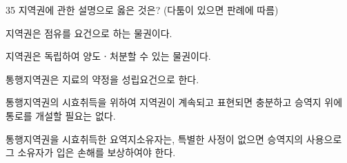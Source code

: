 \begin{question}{35}
지역권에 관한 설명으로 옳은 것은? (다툼이 있으면 판례에 따름)
\begin{choices}
  \item 지역권은 점유를 요건으로 하는 물권이다.
  \item 지역권은 독립하여 양도ㆍ처분할 수 있는 물권이다.
  \item 통행지역권은 지료의 약정을 성립요건으로 한다.
  \item 통행지역권의 시효취득을 위하여 지역권이 계속되고 표현되면 충분하고 승역지 위에 통로를 개설할 필요는 없다.
  \item 통행지역권을 시효취득한 요역지소유자는, 특별한 사정이 없으면 승역지의 사용으로 그 소유자가 입은 손해를 보상하여야 한다.
\end{choices}
\end{question}
